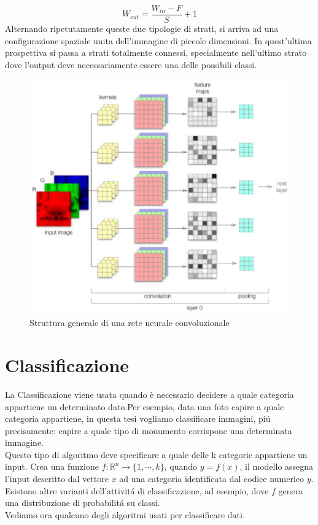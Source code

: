 \documentclass[a4paper,12pt]{report}
\begin{document}
\begin{equation}
W_{out}=\frac{W_{in} - F}{S}+1
\end{equation}
Alternando ripetutamente queste due tipologie di strati, si arriva ad una configurazione spaziale unita dell'immagine di piccole dimensioni. In quest'ultima prospettiva  si passa a strati totalmente connessi, specialmente nell'ultimo strato dove l'output deve necessariamente essere una delle possibili classi.
\begin{figure}[!h]
\centering
\includegraphics{panoramicaConv}
\caption{Struttura generale di una rete neurale convoluzionale}
\end{figure}



\chapter{Classificazione}\label{classificazione}
La Classificazione viene usata quando \`e necessario decidere a quale categoria appartiene un determinato dato.Per esempio, data una foto capire a quale categoria appartiene, in questa tesi vogliamo classificare immagini, pi\'{u} precisamente: capire a quale tipo di monumento corrispone una determinata immagine.\\ 
Questo tipo di algoritmo deve specificare a quale delle k categorie appartiene un input. Crea una funzione $f:\mathbb{R}^{n} \rightarrow \{ 1,\cdots,k\}$, quando $y=f(x)$, il modello assegna l'input descritto dal vettore $x$ ad una categoria identificata dal codice numerico $y$.\\
Esistono altre varianti dell'attivit\'{a} di classificazione, ad esempio, dove $f$ genera una distribuzione di probabilit\'{a} su classi.\\
Vediamo ora qualcuno degli algoritmi usati per classificare dati.
\end{document}
